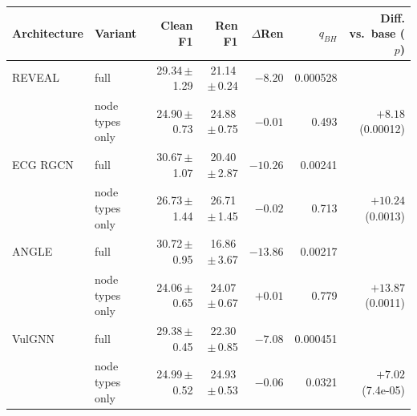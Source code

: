 \begin{tabular}{llrrrrr}
\toprule
Architecture & Variant & Clean F1 & Ren F1 & $\Delta$Ren & $q_{BH}$ & Diff. vs.\ base ($p$) \\
\midrule
REVEAL & full & 29.34\,$\pm$\,1.29 & 21.14\,$\pm$\,0.24 & $\mathbf{-8.20}$ & 0.000528 &  \\
 & node types only & 24.90\,$\pm$\,0.73 & 24.88\,$\pm$\,0.75 & $-0.01$ & 0.493 & $+8.18$ (0.00012) \\
\midrule
ECG RGCN & full & 30.67\,$\pm$\,1.07 & 20.40\,$\pm$\,2.87 & $\mathbf{-10.26}$ & 0.00241 &  \\
 & node types only & 26.73\,$\pm$\,1.44 & 26.71\,$\pm$\,1.45 & $-0.02$ & 0.713 & $+10.24$ (0.0013) \\
\midrule
ANGLE & full & 30.72\,$\pm$\,0.95 & 16.86\,$\pm$\,3.67 & $\mathbf{-13.86}$ & 0.00217 &  \\
 & node types only & 24.06\,$\pm$\,0.65 & 24.07\,$\pm$\,0.67 & $+0.01$ & 0.779 & $+13.87$ (0.0011) \\
\midrule
VulGNN & full & 29.38\,$\pm$\,0.45 & 22.30\,$\pm$\,0.85 & $\mathbf{-7.08}$ & 0.000451 &  \\
 & node types only & 24.99\,$\pm$\,0.52 & 24.93\,$\pm$\,0.53 & $\mathbf{-0.06}$ & 0.0321 & $+7.02$ (7.4e-05) \\
\bottomrule
\end{tabular}
